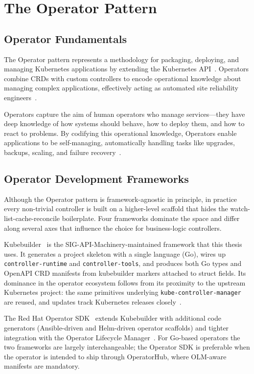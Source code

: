 \section{The Operator Pattern}

\subsection{Operator Fundamentals}

The Operator pattern represents a methodology for packaging, deploying, and managing Kubernetes applications by extending the Kubernetes API~\cite{operator_pattern, dobies2020}. Operators combine CRDs with custom controllers to encode operational knowledge about managing complex applications, effectively acting as automated site reliability engineers~\cite{openshift_operators_lifecycle}.

Operators capture the aim of human operators who manage services—they have deep knowledge of how systems should behave, how to deploy them, and how to react to problems. By codifying this operational knowledge, Operators enable applications to be self-managing, automatically handling tasks like upgrades, backups, scaling, and failure recovery~\cite{dobies2020, ibryam2020}.

\subsection{Operator Development Frameworks}

Although the Operator pattern is framework-agnostic in principle, in practice every non-trivial controller is built on a higher-level scaffold that hides the watch-list-cache-reconcile boilerplate. Four frameworks dominate the space and differ along several axes that influence the choice for business-logic controllers.

Kubebuilder~\cite{kubebuilder} is the SIG-API-Machinery-maintained framework that this thesis uses. It generates a project skeleton with a single language (Go), wires up \texttt{controller-runtime} and \texttt{controller-tools}, and produces both Go types and OpenAPI CRD manifests from kubebuilder markers attached to struct fields. Its dominance in the operator ecosystem follows from its proximity to the upstream Kubernetes project: the same primitives underlying \texttt{kube-controller-manager} are reused, and updates track Kubernetes releases closely~\cite{hausenblas2019}.

The Red Hat Operator SDK~\cite{operator_sdk} extends Kubebuilder with additional code generators (Ansible-driven and Helm-driven operator scaffolds) and tighter integration with the Operator Lifecycle Manager~\cite{openshift_operators_lifecycle}. For Go-based operators the two frameworks are largely interchangeable; the Operator SDK is preferable when the operator is intended to ship through OperatorHub, where OLM-aware manifests are mandatory.

